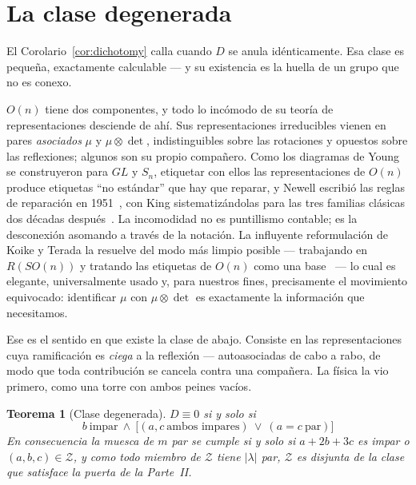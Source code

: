 \documentclass[11pt,a4paper]{article}
\newtheorem{teorema}{Teorema}
\newcommand{\lam}{|\lambda|}
\begin{document}
\section{La clase degenerada}\label{sec:degenerate}
El Corolario~\ref{cor:dichotomy} calla cuando $D$ se anula idénticamente. Esa clase es
pequeña, exactamente calculable --- y su existencia es la huella de un grupo que no es conexo.

$O(n)$ tiene dos componentes, y todo lo incómodo de su teoría de representaciones desciende
de ahí. Sus representaciones irreducibles vienen en pares \emph{asociados} $\mu$ y
$\mu\otimes\det$, indistinguibles sobre las rotaciones y opuestos sobre las reflexiones;
algunos son su propio compañero. Como los diagramas de Young se construyeron para $GL$ y
$S_n$, etiquetar con ellos las representaciones de $O(n)$ produce etiquetas ``no estándar'' que
hay que reparar, y Newell escribió las reglas de reparación en 1951~\cite{Newell}, con King
sistematizándolas para las tres familias clásicas dos décadas después~\cite{King71}. La
incomodidad no es puntillismo contable; es la desconexión asomando a través de la notación.
La influyente reformulación de Koike y Terada la resuelve del modo más limpio posible ---
trabajando en $R(SO(n))$ y tratando las etiquetas de $O(n)$ como una base~\cite{KoikeTerada} ---
lo cual es elegante, universalmente usado y, para nuestros fines, precisamente el movimiento
equivocado: identificar $\mu$ con $\mu\otimes\det$ es exactamente la información que
necesitamos.

Ese es el sentido en que existe la clase de abajo. Consiste en las representaciones cuya
ramificación es \emph{ciega} a la reflexión --- autoasociadas de cabo a rabo, de modo que
toda contribución se cancela contra una compañera. La física la vio primero, como una torre
con ambos peines vacíos.

\begin{teorema}[Clase degenerada]\label{thm:Z}
$D\equiv0$ si y solo si
\[
\boxed{\;b\ \text{impar}\ \wedge\ \big[(a,c\ \text{ambos impares})\ \vee\ (a=c\ \text{par})\big]\;}
\]
En consecuencia la muesca de $m$ par se cumple si y solo si $a+2b+3c$ es impar o
$(a,b,c)\in\mathcal Z$, y como todo miembro de $\mathcal Z$ tiene $\lam$ par, $\mathcal Z$ es
disjunta de la clase que satisface la puerta de la Parte~II.
\end{teorema}
\end{document}
